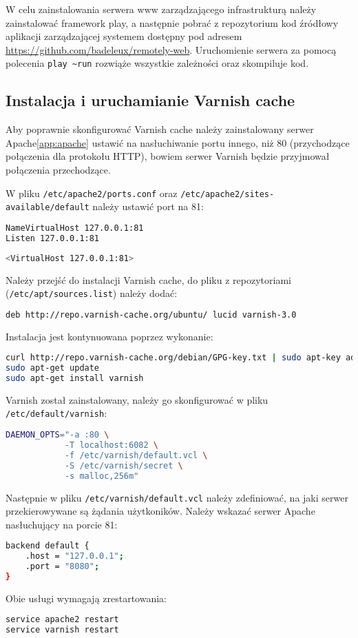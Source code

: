 W celu zainstalowania serwera www zarządzającego infrastrukturą należy zainstalować framework play, a następnie pobrać z repozytorium kod źródłowy aplikacji zarządzającej systemem dostępny pod adresem  \url{https://github.com/badeleux/remotely-web}. Uruchomienie serwera za pomocą polecenia \lstinline|play ~run| rozwiąże wszystkie zależności oraz skompiluje kod. 

\subsection{Instalacja i uruchamianie Varnish cache}

Aby poprawnie skonfigurować Varnish cache należy zainstalowany serwer Apache\ref{app:apache} ustawić na nasłuchiwanie portu innego, niż 80 (przychodzące połączenia dla protokołu HTTP), bowiem serwer Varnish będzie przyjmował połączenia przechodzące.

W pliku \lstinline{/etc/apache2/ports.conf} oraz \lstinline{/etc/apache2/sites-available/default} należy ustawić port na 81:
\begin{lstlisting}[language=bash]
NameVirtualHost 127.0.0.1:81
Listen 127.0.0.1:81
\end{lstlisting}

\begin{lstlisting}[language=bash]
<VirtualHost 127.0.0.1:81>
\end{lstlisting}

Należy przejść do instalacji Varnish cache, do pliku z repozytoriami (\lstinline{/etc/apt/sources.list}) należy dodać:
\begin{lstlisting}[language=bash]
deb http://repo.varnish-cache.org/ubuntu/ lucid varnish-3.0
\end{lstlisting}

Instalacja jest kontynuowana poprzez wykonanie:
\begin{lstlisting}[language=bash]
curl http://repo.varnish-cache.org/debian/GPG-key.txt | sudo apt-key add -
sudo apt-get update
sudo apt-get install varnish
\end{lstlisting}

Varnish został zainstalowany, należy go skonfigurować w pliku \lstinline{/etc/default/varnish}:

\begin{lstlisting}[language=bash]
DAEMON_OPTS="-a :80 \
            -T localhost:6082 \
            -f /etc/varnish/default.vcl \
            -S /etc/varnish/secret \
            -s malloc,256m"
\end{lstlisting}

Następnie w pliku \lstinline{/etc/varnish/default.vcl} należy zdefiniować, na jaki serwer przekierowywane są żądania użytkoników. Należy wskazać serwer Apache nasłuchujący na porcie 81:

\begin{lstlisting}[language=bash]
backend default {
    .host = "127.0.0.1";
    .port = "8080";
}
\end{lstlisting}

Obie usługi wymagają zrestartowania:

\begin{lstlisting}[language=bash]
service apache2 restart
service varnish restart
\end{lstlisting}
